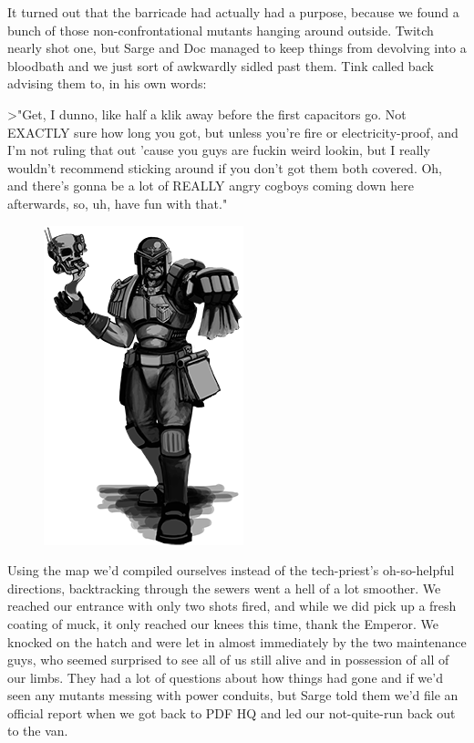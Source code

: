 It turned out that the barricade had actually had a purpose, because we found a bunch of those non-confrontational mutants hanging around outside. 
Twitch nearly shot one, but Sarge and Doc managed to keep things from devolving into a bloodbath and we just sort of awkwardly sidled past them. 
Tink called back advising them to, in his own words:

>"Get, I dunno, like half a klik away before the first capacitors go. 
Not EXACTLY sure how long you got, but unless you're fire or electricity-proof, and I'm not ruling that out 'cause you guys are fuckin weird lookin, but I really wouldn't recommend sticking around if you don't got them both covered. 
Oh, and there's gonna be a lot of REALLY angry cogboys coming down here afterwards, so, uh, have fun with that."

\begin{figure}
	\begin{center}
		\includegraphics[width=\figwidth]{pics/18/21.png}
	\end{center}
\end{figure}
Using the map we'd compiled ourselves instead of the tech-priest's oh-so-helpful directions, backtracking through the sewers went a hell of a lot smoother. 
We reached our entrance with only two shots fired, and while we did pick up a fresh coating of muck, it only reached our knees this time, thank the Emperor. 
We knocked on the hatch and were let in almost immediately by the two maintenance guys, who seemed surprised to see all of us still alive and in possession of all of our limbs. 
They had a lot of questions about how things had gone and if we'd seen any mutants messing with power conduits, but Sarge told them we'd file an official report when we got back to PDF HQ and led our not-quite-run back out to the van.

